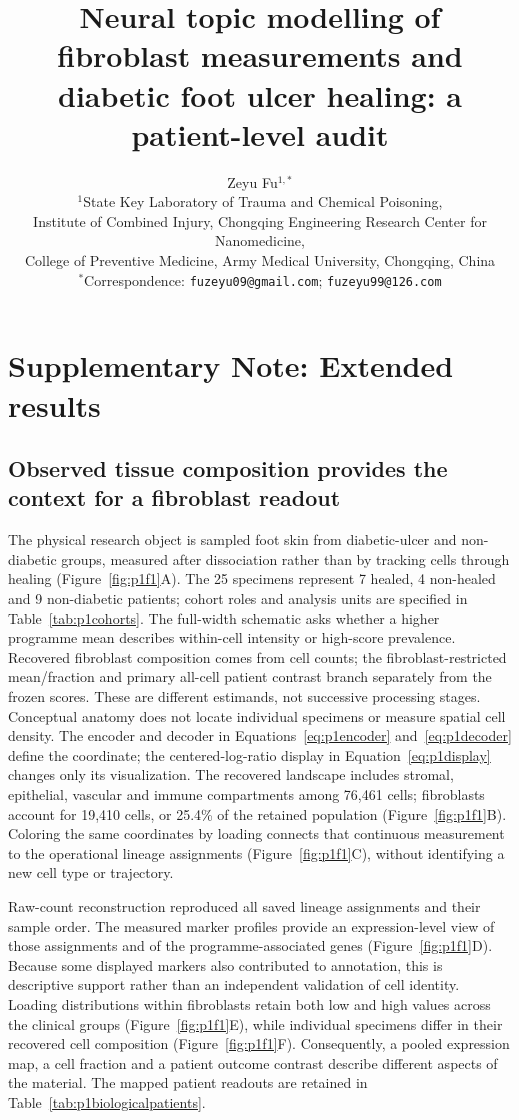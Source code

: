 \documentclass[10pt,a4paper]{article}
\title{Neural topic modelling of fibroblast measurements and diabetic foot ulcer healing: a patient-level audit}
\author{Zeyu Fu$^{1,*}$\\[3pt]\small $^1$State Key Laboratory of Trauma and Chemical Poisoning,\\\small Institute of Combined Injury, Chongqing Engineering Research Center for Nanomedicine,\\\small College of Preventive Medicine, Army Medical University, Chongqing, China\\\small $^*$Correspondence: \texttt{fuzeyu09@gmail.com}; \texttt{fuzeyu99@126.com}}\date{}
\begin{document}
\maketitle\supplement
\section*{Supplementary Note: Extended results}
\subsection{Observed tissue composition provides the context for a fibroblast readout}




The physical research object is sampled foot skin from diabetic-ulcer and non-diabetic groups, measured after dissociation rather than by tracking cells through healing (Figure~\ref{fig:p1f1}A\label{call:p1f1}). The 25 specimens represent 7 healed, 4 non-healed and 9 non-diabetic patients; cohort roles and analysis units are specified in Table~\ref{tab:p1cohorts}. The full-width schematic asks whether a higher programme mean describes within-cell intensity or high-score prevalence. Recovered fibroblast composition comes from cell counts; the fibroblast-restricted mean/fraction and primary all-cell patient contrast branch separately from the frozen scores. These are different estimands, not successive processing stages. Conceptual anatomy does not locate individual specimens or measure spatial cell density. The encoder and decoder in Equations~\eqref{eq:p1encoder} and~\eqref{eq:p1decoder} define the coordinate; the centered-log-ratio display in Equation~\eqref{eq:p1display} changes only its visualization. The recovered landscape includes stromal, epithelial, vascular and immune compartments among 76,461 cells; fibroblasts account for 19,410 cells, or 25.4\% of the retained population (Figure~\ref{fig:p1f1}B). Coloring the same coordinates by loading connects that continuous measurement to the operational lineage assignments (Figure~\ref{fig:p1f1}C), without identifying a new cell type or trajectory.

Raw-count reconstruction reproduced all saved lineage assignments and their sample order. The measured marker profiles provide an expression-level view of those assignments and of the programme-associated genes (Figure~\ref{fig:p1f1}D). Because some displayed markers also contributed to annotation, this is descriptive support rather than an independent validation of cell identity. Loading distributions within fibroblasts retain both low and high values across the clinical groups (Figure~\ref{fig:p1f1}E), while individual specimens differ in their recovered cell composition (Figure~\ref{fig:p1f1}F). Consequently, a pooled expression map, a cell fraction and a patient outcome contrast describe different aspects of the material. The mapped patient readouts are retained in Table~\ref{tab:p1biologicalpatients}.
\end{document}
